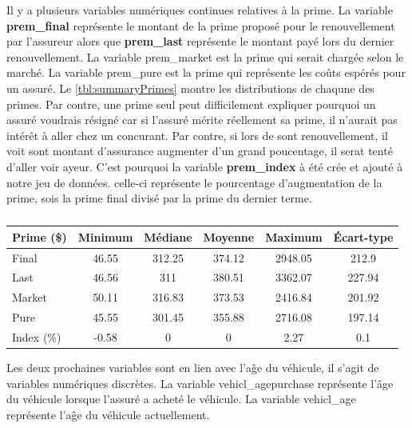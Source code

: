 \documentclass[
]{article}
\begin{document}
Il y a plusieurs variables numériques continues relatives à la prime. La
variable \textbf{prem\_final} représente le montant de la prime proposé
pour le renouvellement par l'assureur alors que \textbf{prem\_last}
représente le montant payé lors du dernier renouvellement. La variable
prem\_market est la prime qui serait chargée selon le marché. La
variable prem\_pure est la prime qui représente les coûts espérés pour
un assuré. Le \autoref{tbl:summaryPrimes} montre les distributions de
chaqune des primes. Par contre, une prime seul peut difficilement
expliquer pourquoi un assuré voudrais résigné car si l'assuré mérite
réellement sa prime, il n'aurait pas intérêt à aller chez un concurant.
Par contre, si lors de sont renouvellement, il voit sont montant
d'assurance augmenter d'un grand poucentage, il serat tenté d'aller voir
ayeur. C'est pourquoi la variable \textbf{prem\_index} à été crée et
ajouté à notre jeu de données. celle-ci représente le pourcentage
d'augmentation de la prime, sois la prime final divisé par la prime du
dernier terme.

\begin{table}[ht]
\centering
\caption{} 
\label{}
\begin{tabular}{lccccc}
  \hline
Prime (\$) & Minimum & Médiane & Moyenne & Maximum & Écart-type \\ 
  \hline
Final & 46.55 & 312.25 & 374.12 & 2948.05 & 212.9 \\ 
  Last & 46.56 & 311 & 380.51 & 3362.07 & 227.94 \\ 
  Market & 50.11 & 316.83 & 373.53 & 2416.84 & 201.92 \\ 
  Pure & 45.55 & 301.45 & 355.88 & 2716.08 & 197.14 \\ 
   \hline
Index (\%) & -0.58 & 0 & 0 & 2.27 & 0.1 \\ 
   \hline
\end{tabular}
\end{table}

Les deux prochaines variables sont en lien avec l'aĝe du véhicule, il
s'agit de variables numériques discrètes. La variable
vehicl\_agepurchase représente l'âge du véhicule lorsque l'assuré a
acheté le véhicule. La variable vehicl\_age représente l'aĝe du véhicule
actuellement.
\end{document}
